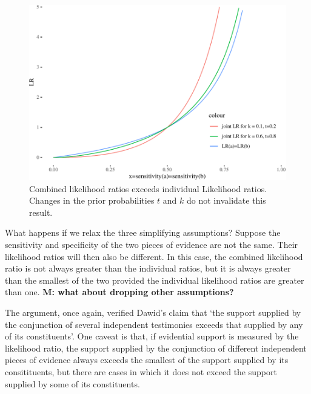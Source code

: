 \documentclass[10pt,dvipsnames,enabledeprecatedfontcommands]{scrartcl}
\begin{document}
\begin{figure}


\begin{center}\includegraphics[width=0.9\linewidth]{conjunction-paradox_files/figure-latex/unnamed-chunk-7-1} \end{center}

\caption{Combined likelihood ratios exceeds individual Likelihood ratios. Changes in the prior 
probabilities $t$ and $k$ do not invalidate this result.}
\label{fig:jointLRMarcello}
\end{figure}

What happens if we relax the three simplifying assumptions? Suppose the
sensitivity and specificity of the two pieces of evidence are not the
same. Their likelihood ratios will then also be different. In this case,
the combined likelihood ratio is not always greater than the individual
ratios, but it is always greater than the smallest of the two provided
the individual likelihood ratios are greater than one.
\textbf{M: what about dropping other assumptions?}


The argument, once again, verified Dawid's claim that `the support
supplied by the conjunction of several independent testimonies exceeds
that supplied by any of its constituents'. One caveat is that, if
evidential support is measured by the likelihood ratio, the support
supplied by the conjunction of different independent pieces of evidence
always exceeds the smallest of the support supplied by its
consitituents, but there are cases in which it does not exceed the
support supplied by some of its constituents.
\end{document}
